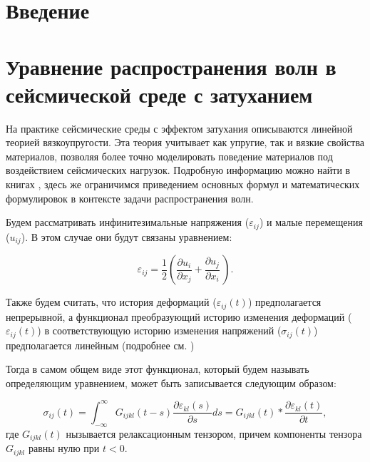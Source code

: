 \documentclass[a4paper, fontsize=14pt]{article}
\begin{document}
\tableofcontents

\newpage

\section*{Введение}
\newpage


\section*{Уравнение распространения волн в сейсмической среде с затуханием} 

На практике сейсмические среды с эффектом затухания описываются линейной теорией вязкоупругости.
Эта теория учитывает как упругие, так и вязкие свойства материалов,
позволяя более точно моделировать поведение материалов под воздействием сейсмических нагрузок. 
Подробную информацию можно найти в книгах \cite{Christenses,Mainardi,Carcione,Borcherdt}, здесь же ограничимся
приведением основных формул и математических формулировок в контексте задачи распространения волн.

Будем рассматривать инфинитезимальные напряжения ($\varepsilon_{ij}$) и малые перемещения ($u_{ij}$).
В этом случае они будут связаны уравнением:

\begin{equation}
    \label{eq:strain_u_rel}
    \varepsilon_{ij} = \frac{1}{2} \left( \frac{\partial u_i}{\partial x_j} + \frac{\partial u_j}{\partial x_i}\, \right). 
\end{equation}

Также будем считать, что история деформаций ($\varepsilon_{ij}(t)$) предполагается непрерывной, а функционал преобразующий историю изменения деформаций ($\varepsilon_{ij}(t)$) в соответствующую историю изменения напряжений ($\sigma_{ij}(t)$) предполагается линейным (подробнее см. \cite{Christenses})

Тогда в самом общем виде этот функционал, который будем называть определяющим уравнением, может быть записывается следующим образом:

\begin{equation}
    \label{eq:hooks_law}
    \sigma_{ij}(t) = \int_{-\infty}^{\infty} G_{ijkl} (t - s) \frac{\partial \varepsilon_{kl} (s)}{\partial s} d s = G_{ijkl}(t) \ast  \frac{\partial \varepsilon_{kl} (t)}{\partial t} ,
\end{equation}
где $G_{ijkl}(t)$ нызывается релаксационным тензором, причем компоненты тензора $G_{ijkl}$ равны нулю при $t < 0$.
\end{document}
